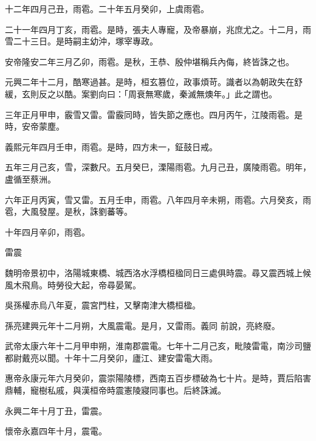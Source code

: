 \begin{pinyinscope}
 十二年四月己丑，雨雹。二十年五月癸卯，上虞雨雹。



 二十一年四月丁亥，雨雹。是時，張夫人專寵，及帝暴崩，兆庶尤之。十二月，雨雪二十三日。是時嗣主幼沖，塚宰專政。



 安帝隆安二年三月乙卯，雨雹。是秋，王恭、殷仲堪稱兵內侮，終皆誅之也。



 元興二年十二月，酷寒過甚。是時，桓玄篡位，政事煩苛。識者以為朝政失在舒緩，玄則反之以酷。案劉向曰：「周衰無寒歲，秦滅無燠年。」此之謂也。



 三年正月甲申，霰雪又雷。雷霰同時，皆失節之應也。四月丙午，江陵雨雹。是時，安帝蒙塵。



 義熙元年四月壬申，雨雹。是時，四方未一，鉦鼓日戒。



 五年三月己亥，雪，深數尺。五月癸巳，溧陽雨雹。九月己丑，廣陵雨雹。明年，盧循至蔡洲。



 六年正月丙寅，雪又雷。五月壬申，雨雹。八年四月辛未朔，雨雹。六月癸亥，雨雹，大風發屋。是秋，誅劉蕃等。



 十年四月辛卯，雨雹。



 雷震



 魏明帝景初中，洛陽城東橋、城西洛水浮橋桓楹同日三處俱時震。尋又震西城上候風木飛鳥。時勞役大起，帝尋晏駕。



 吳孫權赤烏八年夏，震宮門柱，又擊南津大橋桓楹。



 孫亮建興元年十二月朔，大風震電。是月，又雷雨。義同
 前說，亮終廢。



 武帝太康六年十二月甲申朔，淮南郡震電。七年十二月己亥，毗陵雷電，南沙司鹽都尉戴亮以聞。十年十二月癸卯，廬江、建安雷電大雨。



 惠帝永康元年六月癸卯，震崇陽陵標，西南五百步標破為七十片。是時，賈后陷害鼎輔，寵樹私戚，與漢桓帝時震憲陵寢同事也。后終誅滅。



 永興二年十月丁丑，雷震。



 懷帝永嘉四年十月，震電。




\end{pinyinscope}
